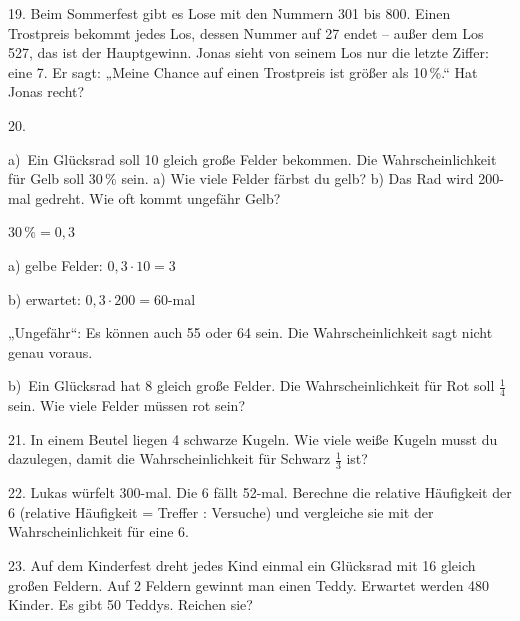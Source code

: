 \documentclass[11pt]{article}
\newcommand{\grau}[1]{{\color{mbgrau}#1}}
\begin{document}
\begin{pfaufg}{}{19.}{}
Beim Sommerfest gibt es Lose mit den Nummern 301 bis 800. Einen Trostpreis bekommt jedes Los, dessen Nummer auf 27 endet – außer dem Los 527, das ist der Hauptgewinn. Jonas sieht von seinem Los nur die letzte Ziffer: eine 7. Er sagt: „Meine Chance auf einen Trostpreis ist größer als 10\,\%.“ Hat Jonas recht?
\end{pfaufg}

\begin{pfaufg}{}{20.}{}
\grau{a)\ Ein Glücksrad soll 10 gleich große Felder bekommen. Die Wahrscheinlichkeit für Gelb soll 30\,\% sein. a) Wie viele Felder färbst du gelb? b) Das Rad wird 200-mal gedreht. Wie oft kommt ungefähr Gelb?\par\smallskip $30\,\% = 0{,}3$\par a) gelbe Felder: $0{,}3 \cdot 10 = 3$\par b) erwartet: $0{,}3 \cdot 200 = 60$-mal\par „Ungefähr“: Es können auch 55 oder 64 sein. Die Wahrscheinlichkeit sagt nicht genau voraus.}
\par\medskip
b)\ Ein Glücksrad hat 8 gleich große Felder. Die Wahrscheinlichkeit für Rot soll $\frac{1}{4}$ sein. Wie viele Felder müssen rot sein?
\end{pfaufg}

\begin{pfaufg}{}{21.}{}
In einem Beutel liegen 4 schwarze Kugeln. Wie viele weiße Kugeln musst du dazulegen, damit die Wahrscheinlichkeit für Schwarz $\frac{1}{3}$ ist?
\end{pfaufg}

\begin{pfaufg}{}{22.}{}
Lukas würfelt 300-mal. Die 6 fällt 52-mal. Berechne die relative Häufigkeit der 6 (relative Häufigkeit = Treffer : Versuche) und vergleiche sie mit der Wahrscheinlichkeit für eine 6.
\end{pfaufg}

\begin{pfaufg}{}{23.}{}
Auf dem Kinderfest dreht jedes Kind einmal ein Glücksrad mit 16 gleich großen Feldern. Auf 2 Feldern gewinnt man einen Teddy. Erwartet werden 480 Kinder. Es gibt 50 Teddys. Reichen sie?
\end{pfaufg}
\end{document}
